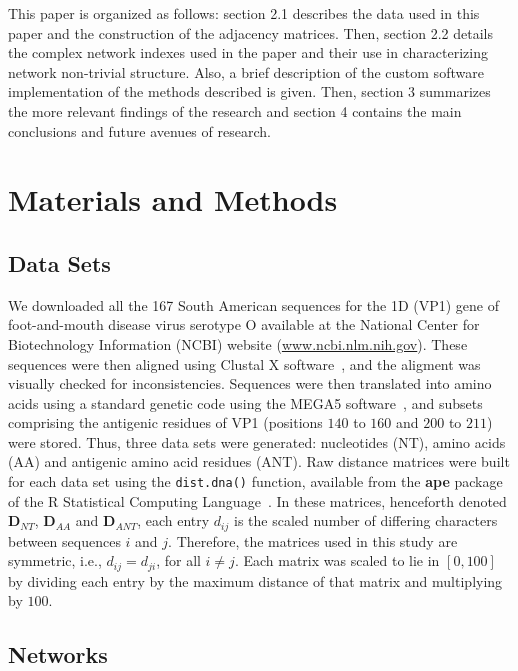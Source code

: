 \documentclass[10pt,letterpaper]{article}
\begin{document}
This paper is organized as follows: section 2.1 describes the data used in this paper and the construction of the adjacency matrices. Then, section 2.2 details the complex network indexes used in the paper and their use in characterizing network non-trivial structure. Also, a brief description of the custom software implementation of the methods described is given. Then, section 3 summarizes the more relevant findings of the research and section 4 contains the main conclusions and future avenues of research.



\section*{Materials and Methods}

\subsection*{Data Sets}

We downloaded all the 167 South American sequences for the 1D (VP1) gene of foot-and-mouth disease virus serotype O available at the National Center for Biotechnology Information (NCBI) website (\url{www.ncbi.nlm.nih.gov}).
These sequences were then aligned using Clustal X software~\cite{clustal}, and the aligment was visually checked for inconsistencies. Sequences were then translated into amino acids using a standard genetic code using the MEGA5 software~\cite{MEGA}, and subsets comprising the antigenic residues of VP1 (positions $140$ to $160$ and $200$ to $211$)~\cite{antigenic} were stored.
Thus, three data sets were generated: nucleotides (NT), amino acids (AA) and antigenic amino acid residues (ANT).
Raw distance matrices were built for each data set using the \verb|dist.dna()| function, available from the \textbf{ape} package of the R Statistical Computing Language~\cite{R}.
In these matrices, henceforth denoted $\mathbf{D}_{NT}$, $\mathbf{D}_{AA}$ and $\mathbf{D}_{ANT}$, each entry $d_{ij}$ is the scaled number of differing characters between sequences $i$ and $j$.
Therefore, the matrices used in this study are symmetric, i.e., $d_{ij} = d_{ji}$, for all $i \neq j$.
Each matrix was scaled to lie in $[0,100]$ by dividing each entry by the maximum distance of that matrix and multiplying by $100$.
 
\subsection*{Networks}
\end{document}
